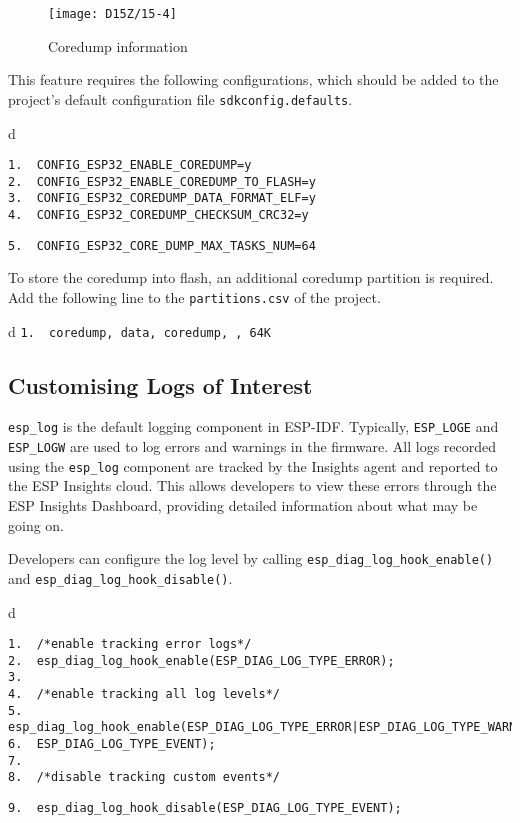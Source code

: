 \documentclass[a4paper,12pt]{book}
\begin{document}
\begin{figure}[!h]
    \centering
    \texttt{[image: D15Z/15-4]}
    \caption{Coredump information}
\end{figure}

This feature requires the following configurations, which should be added to the project's default configuration file \verb|sdkconfig.defaults|.

\begin{codebloc}
\begin{tabular}{d}
\vspace{2pt}
\begin{verbatim}
1.  CONFIG_ESP32_ENABLE_COREDUMP=y
2.  CONFIG_ESP32_ENABLE_COREDUMP_TO_FLASH=y
3.  CONFIG_ESP32_COREDUMP_DATA_FORMAT_ELF=y
4.  CONFIG_ESP32_COREDUMP_CHECKSUM_CRC32=y
\end{verbatim}
\verb|5.  CONFIG_ESP32_CORE_DUMP_MAX_TASKS_NUM=64|
\end{tabular}
\end{codebloc}

To store the coredump into flash, an additional coredump partition is required. Add the following line to the \verb|partitions.csv| of the project.

\begin{codebloc}
\begin{tabular}{d}
\verb|1.  coredump, data, coredump, , 64K|
\end{tabular}
\end{codebloc}

\subsection{Customising Logs of Interest}
\verb|esp_log| is the default logging component in ESP-IDF. Typically, \verb|ESP_LOGE| and \verb|ESP_LOGW| are used to log errors and warnings in the firmware. All logs recorded using the \verb|esp_log| component are tracked by the Insights agent and reported to the ESP Insights cloud. This allows developers to view these errors through the ESP Insights Dashboard, providing detailed information about what may be going on.

Developers can configure the log level by calling \verb|esp_diag_log_hook_enable()| and \verb|esp_diag_log_hook_disable()|.

\begin{codebloc}
\begin{tabular}{d}
\vspace{2pt}
\begin{verbatim}
1.  /*enable tracking error logs*/
2.  esp_diag_log_hook_enable(ESP_DIAG_LOG_TYPE_ERROR);
3.
4.  /*enable tracking all log levels*/
5.  esp_diag_log_hook_enable(ESP_DIAG_LOG_TYPE_ERROR|ESP_DIAG_LOG_TYPE_WARNING|
6.  ESP_DIAG_LOG_TYPE_EVENT);
7.
8.  /*disable tracking custom events*/
\end{verbatim}
\verb|9.  esp_diag_log_hook_disable(ESP_DIAG_LOG_TYPE_EVENT);|
\end{tabular}
\end{codebloc}
\end{document}
